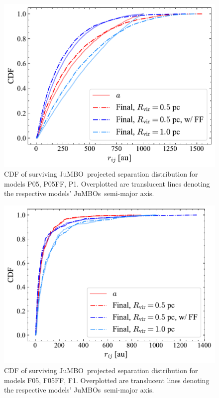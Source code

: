 \documentclass[submission,phys]{lib/SciPost}
\newcommand{\jumbo}{\mbox{JuMBO}}
\newcommand{\jumbos}{\mbox{JuMBOs}}
\begin{document}
\begin{appendix}
    \begin{figure}
    \centering
        \includegraphics[width=\columnwidth]{figures/Plummer_General_proj_sep.pdf}
        \caption{CDF of surviving \jumbo\, projected separation distribution for models P05, P05FF, P1. Overplotted are translucent lines denoting the respective models' \jumbos\, semi-major axis.}
         \label{Fig:Plummer_rsep}
   \end{figure}
   \begin{figure}
    \centering
        \includegraphics[width=\columnwidth]{figures/Fractal_General_proj_sep.pdf}
        \caption{CDF of surviving \jumbo\, projected separation distribution for models F05, F05FF, F1. Overplotted are translucent lines denoting the respective models' \jumbos\, semi-major axis.}
         \label{Fig:Fractal_rsep}
   \end{figure}
\end{appendix}
\end{document}
